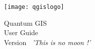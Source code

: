 
\begin{titlepage}
\begin{center}

\begin{center}
\texttt{[image: qgislogo]} 
\end{center}

\Huge{Quantum GIS}\\
\vspace{0.5cm}
\Large{User Guide} \\
\vspace{0.5cm}
\Large{Version ~\CURRENT \textsl{'This is no moon !'}}

\end{center}
\end{titlepage}
